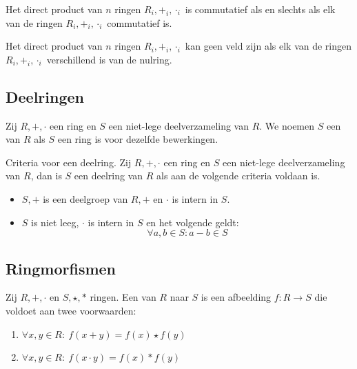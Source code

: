 \documentclass[main.tex]{subfiles}
\begin{document}
\begin{st}
  Het direct product van $n$ ringen $R_{i},+_{i},\cdot_{i}$ is commutatief als en slechts als elk van de ringen $R_{i},+_{i},\cdot_{i}$ commutatief is.
\end{st}

\begin{st}
  Het direct product van $n$ ringen $R_{i},+_{i},\cdot_{i}$ kan geen veld zijn als elk van de ringen $R_{i},+_{i},\cdot_{i}$ verschillend is van de nulring.
\end{st}

\subsection{Deelringen}
\label{sec:deelringen}

\begin{de}
  Zij $R,+,\cdot$ een ring en $S$ een niet-lege deelverzameling van $R$.
  We noemen $S$ een  van $R$ als $S$ een ring is voor dezelfde bewerkingen.
\end{de}

\begin{st}
  \label{st:deelring-criteria}
  Criteria voor een deelring.
  Zij $R,+,\cdot$ een ring en $S$ een niet-lege deelverzameling van $R$, dan is $S$ een deelring van $R$ als aan de volgende criteria voldaan is.
  \begin{itemize}
  \item $S,+$ is een deelgroep van $R,+$ en $\cdot$ is intern in $S$.
  \item $S$ is niet leeg, $\cdot$ is intern in $S$ en het volgende geldt:
    \[ \forall a,b \in S: a - b \in S \]
  \end{itemize}
\end{st}

\subsection{Ringmorfismen}
\label{sec:ringmorfismen}

\begin{de}
  Zij $R,+,\cdot$ en $S,\star,*$ ringen.
  Een  van $R$ naar $S$ is een afbeelding $f: R\rightarrow S$ die voldoet aan twee voorwaarden:
  \begin{enumerate}
  \item $\forall x,y \in R:\ f(x + y) = f(x) \star f(y)$
  \item $\forall x,y \in R:\ f(x \cdot y) = f(x) * f(y)$
  \end{enumerate}
\end{de}
\end{document}
